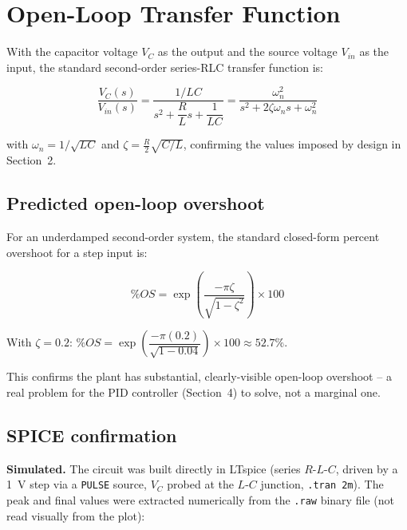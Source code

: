 \documentclass[11pt,letterpaper]{article}
\begin{document}
\section{Open-Loop Transfer Function}

With the capacitor voltage $V_C$ as the output and the source voltage $V_{in}$ as the input, the
standard second-order series-RLC transfer function is:

\begin{tcolorbox}[colback=blue!5,colframe=blue!40!black,arc=1mm]
\begin{equation}
\frac{V_C(s)}{V_{in}(s)} = \frac{1/LC}{s^2 + \dfrac{R}{L}s + \dfrac{1}{LC}} = \frac{\omega_n^2}{s^2+2\zeta\omega_n s+\omega_n^2}
\end{equation}
\end{tcolorbox}

with $\omega_n = 1/\sqrt{LC}$ and $\zeta = \frac{R}{2}\sqrt{C/L}$, confirming the values imposed by design
in Section~2.

\subsection{Predicted open-loop overshoot}

For an underdamped second-order system, the standard closed-form percent overshoot for a step input is:

\begin{equation}
\%OS = \exp\left(\frac{-\pi\zeta}{\sqrt{1-\zeta^2}}\right)\times 100
\end{equation}

With $\zeta=0.2$: $\%OS = \exp\left(\dfrac{-\pi(0.2)}{\sqrt{1-0.04}}\right)\times100 \approx \boxed{52.7\%}$.

This confirms the plant has substantial, clearly-visible open-loop overshoot -- a real problem for the
PID controller (Section~4) to solve, not a marginal one.

\subsection{SPICE confirmation}

\textbf{Simulated.} The circuit was built directly in LTspice (series $R$-$L$-$C$, driven by a
\SI{1}{\volt} step via a \texttt{PULSE} source, $V_C$ probed at the $L$-$C$ junction, \texttt{.tran 2m}).
The peak and final values were extracted numerically from the \texttt{.raw} binary file (not read
visually from the plot):
\end{document}
